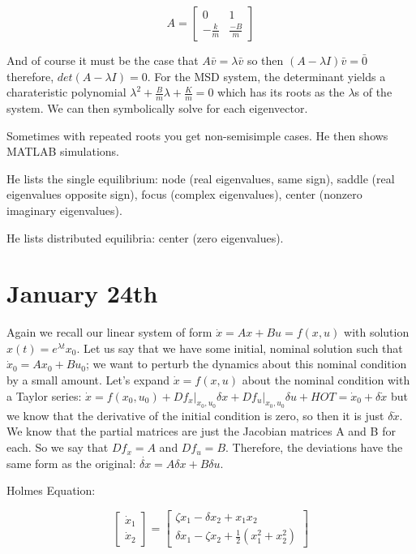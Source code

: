 \documentclass[11pt]{article}
\begin{document}
\begin{equation}
A=
\begin{bmatrix}
0 &1 \\
-\frac{k}{m} &\frac{-B}{m}
\end{bmatrix}
\end{equation}

And of course it must be the case that $A\bar{v} = \lambda \bar{v}$ so then $(A-\lambda I)\bar{v} = \bar{0}$ therefore, $det(A-\lambda I) = 0$. For the MSD system, the determinant yields a charateristic polynomial $\lambda^2 + \frac{B}{m}\lambda + \frac{K}{m}=0$ which has its roots as the $\lambda$s of the system. We can then symbolically solve for each eigenvector.

Sometimes with repeated roots you get non-semisimple cases. He then shows MATLAB simulations.

He lists the single equilibrium: node (real eigenvalues, same sign), saddle (real eigenvalues opposite sign), focus (complex eigenvalues), center (nonzero imaginary eigenvalues).

He lists distributed equilibria: center (zero eigenvalues).



\section*{January 24th}
Again we recall our linear system of form $\dot{x} = Ax + Bu = f(x,u)$ with solution $x(t) = e^{\lambda t}x_0$. Let us say that we have some initial, nominal solution such that $\dot{x}_0 = Ax_0 + Bu_0$; we want to perturb the dynamics about this nominal condition by a small amount. Let's expand $\dot{x} = f(x,u)$ about the nominal condition with a Taylor series: $\dot{x} = f(x_0,u_0) + Df_x \lvert_{x_0 , u_0} \delta x + Df_u \lvert_{x_0 , u_0} \delta u + HOT =  \dot{x}_0 + \delta \dot{x}$ but we know that the derivative of the initial condition is zero, so then it is just $\delta\dot{x}$. We know that the partial matrices are just the Jacobian matrices A and B for each. So we say that $Df_x = A$ and $Df_u = B$. Therefore, the deviations have the same form as the original: $\dot{\delta x} = A \delta x + B \delta u$.

Holmes Equation: 

\begin{equation}
\begin{bmatrix}
\dot{x}_1 \\
\dot{x}_2
\end{bmatrix}
 = 
\begin{bmatrix}
\zeta x_1 - \delta x_2 + x_1x_2 \\
\delta x_1 -\zeta x_2 + \frac{1}{2}(x_1^2 + x_2^2)
\end{bmatrix}
\end{equation}
\end{document}
